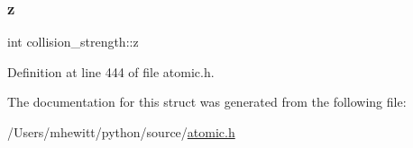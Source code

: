 \subsubsection{\texorpdfstring{z}{z}}
{\footnotesize\ttfamily int collision\+\_\+strength\+::z}



Definition at line 444 of file atomic.\+h.



The documentation for this struct was generated from the following file\+:\begin{DoxyCompactItemize}
\item 
/\+Users/mhewitt/python/source/\hyperlink{atomic_8h}{atomic.\+h}\end{DoxyCompactItemize}
